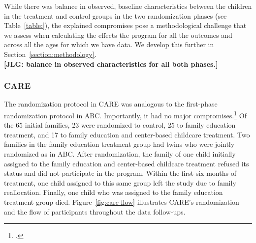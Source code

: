 \noindent While there was balance in observed, baseline characteristics between the children in the treatment and control groups in the two randomization phases (see Table~\ref{table:}), the explained compromises pose a methodological challenge that we assess when calculating the effects the program for all the outcomes and across all the ages for which we have data. We develop this further in Section~\ref{section:methodology}.\\

\noindent \textbf{[JLG: balance in observed characteristics for all both phases.]}\\

\subsubsection{CARE}

\noindent 
The randomization protocol in CARE was analogous to the first-phase randomization protocol in ABC. Importantly, it had no major compromises.\footnote{\citet{Bryant_et_al_1987_Carolina_Approach_TIECSE,Wasik_Ramey_etal_1990_CD,Burchinal_Campbell_etal_1997_CD}.} Of the 65 initial families, 23 were randomized to control, 25 to family education treatment, and 17 to family education and center-based childcare treatment. Two families in the family education treatment group had twins who were jointly randomized as in ABC. After randomization, the family of one child initially assigned to the family education and center-based childcare treatment refused its status and did not participate in the program. Within the first six months of treatment, one child assigned to this same group left the study due to family reallocation. Finally, one child who was assigned to the family education treatment group died. Figure~\ref{fig:care-flow} illustrates CARE's randomization and the flow of participants throughout the data follow-ups.\\

